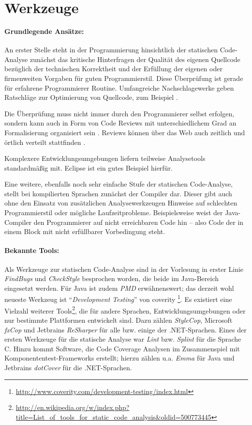 \section{Werkzeuge}

\paragraph{Grundlegende Ansätze:} An erster Stelle steht in der Programmierung hinsichtlich der statischen Code-Analyse zunächst das kritische Hinterfragen der Qualität des eigenen Quellcode bezüglich der technischen Korrektheit und der  Erfüllung der eigenen oder firmenweiten Vorgaben für guten Programmierstil. Diese Überprüfung ist gerade für erfahrene Programmierer Routine. Umfangreiche Nachschlagewerke geben Ratschläge zur Optimierung von Quellcode, zum Beispiel \cite{mcconnell2004}.

Die Überprüfung muss nicht immer durch den Programmierer selbst erfolgen, sondern kann auch in Form von Code Reviews mit unterschiedlichem Grad an Formalisierung organisiert sein \citep{spillner2011}. Reviews können über das Web auch zeitlich und örtlich verteilt stattfinden \citep{codereviews:meyer}.

Komplexere Entwicklungsumgebungen liefern teilweise Analysetools standardmäßig mit. Eclipse ist ein gutes Beispiel hierfür.

Eine weitere, ebenfalls noch sehr einfache Stufe der statischen Code-Analyse, stellt bei kompilierten Sprachen zunächst der Compiler dar. Dieser gibt auch ohne den Einsatz von zusätzlichen Analysewerkzeugen Hinweise auf schlechten Programmierstil oder mögliche Laufzeitprobleme. Beispielsweise weist der Java-Compiler den Programmierer auf nicht erreichbaren Code hin -- also Code der in einem Block mit nicht erfüllbarer Vorbedingung steht.

\paragraph{Bekannte Tools:} Als Werkzeuge zur statischen Code-Analyse sind in der Vorlesung in erster Linie \textit{FindBugs} und \textit{CheckStyle} besprochen worden, die beide im Java-Bereich eingesetzt werden. Für Java ist zudem \textit{PMD} erwähnenswert; das derzeit wohl neueste Werkzeug ist ``\textit{Development Testing}'' von coverity \citep{neumann2012}\footnote{\url{http://www.coverity.com/development-testing/index.html}}. Es existiert eine Vielzahl weiterer Tools\footnote{\url{http://en.wikipedia.org/w/index.php?title=List_of_tools_for_static_code_analysis\&oldid=500773445}}, die für andere Sprachen, Entwicklungsumgebungen oder nur bestimmte Plattformen entwickelt sind. Dazu zählen \textit{StyleCop}, Microsoft \textit{fxCop} und Jetbrains \textit{ReSharper} für alle bzw. einige der .NET-Sprachen. Eines der ersten Werkzeuge für die statische Analyse war \textit{Lint} bzw. \textit{Splint} für die Sprache C. Hinzu kommt Software, die  Code Coverage Analysen im Zusammenspiel mit Komponententest-Frameworks erstellt; hierzu zählen u.a. \textit{Emma} für Java und Jetbrains \textit{dotCover} für die .NET-Sprachen.


